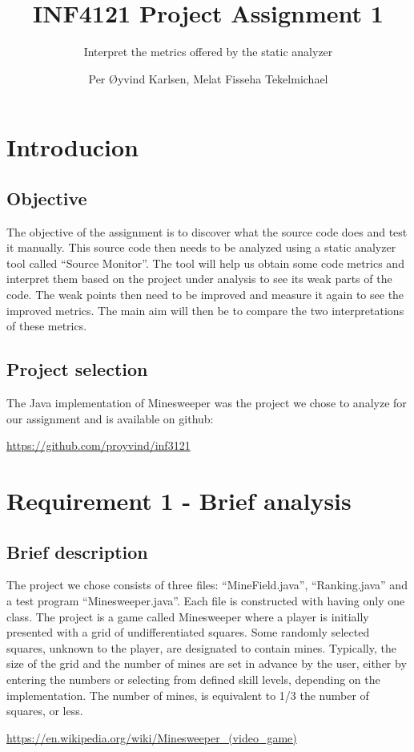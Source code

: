 \documentclass[UKenglish]{article}  %
\title{INF4121 Project Assignment 1}
\subtitle{Interpret the metrics offered by the static analyzer}
\author{Per Øyvind Karlsen, Melat Fisseha Tekelmichael}
\begin{document}
\ififorside

\section{Introducion}

\subsection{Objective}
The objective of the assignment is to discover what the source code does and
test it manually. This source code then needs to be analyzed using a static
analyzer tool called “Source Monitor”. The tool will help us obtain some
code metrics and interpret them based on the project under analysis to see its
weak parts of the code. The weak points then need to be improved and measure
it again to see the improved metrics.
The main aim will then be to compare the two interpretations of these metrics. 

\subsection{Project selection}
The Java implementation of Minesweeper was the project we chose to analyze for
our assignment and is available on github:

\url{https://github.com/proyvind/inf3121}

\section{Requirement 1 - Brief analysis}

\subsection{Brief description}
The project we chose consists of three files: “MineField.java”,
“Ranking.java” and a test program  “Minesweeper.java”.
Each file is constructed with having only one class.
The project is a game called Minesweeper where a player is initially presented
with a grid of undifferentiated squares. Some randomly selected squares,
unknown to the player, are designated to contain mines.
Typically, the size of the grid and the number of mines are set in advance by
the user, either by entering the numbers or selecting from defined skill
levels, depending on the implementation. The number of mines, is equivalent to
1/3 the number of squares, or less.

\url{https://en.wikipedia.org/wiki/Minesweeper_(video_game)}
\end{document}
